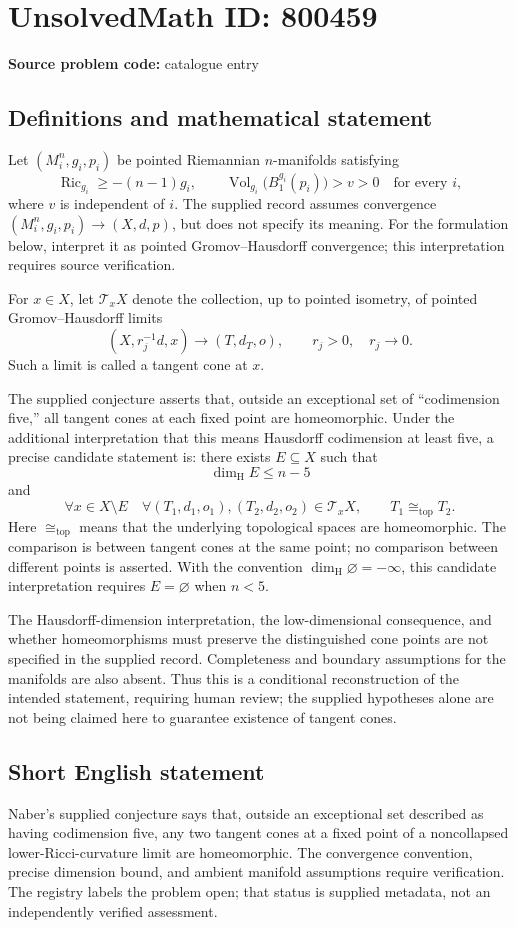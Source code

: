 \documentclass[11pt]{article}
\begin{document}
\section*{UnsolvedMath ID: 800459}
\textbf{Source problem code:} catalogue entry
\subsection{Definitions and mathematical statement}
Let \((M_i^n,g_i,p_i)\) be pointed Riemannian \(n\)-manifolds satisfying
\[
\operatorname{Ric}_{g_i}\geq -(n-1)g_i,
\qquad
\operatorname{Vol}_{g_i}\bigl(B_1^{g_i}(p_i)\bigr)>v>0
\quad\text{for every }i,
\]
where \(v\) is independent of \(i\). The supplied record assumes convergence \((M_i^n,g_i,p_i)\to(X,d,p)\), but does not specify its meaning. For the formulation below, interpret it as pointed Gromov--Hausdorff convergence; this interpretation requires source verification.

For \(x\in X\), let \(\mathcal T_xX\) denote the collection, up to pointed isometry, of pointed Gromov--Hausdorff limits
\[
(X,r_j^{-1}d,x)\longrightarrow(T,d_T,o),
\qquad r_j>0,\quad r_j\to0.
\]
Such a limit is called a tangent cone at \(x\).

The supplied conjecture asserts that, outside an exceptional set of ``codimension five,'' all tangent cones at each fixed point are homeomorphic. Under the additional interpretation that this means Hausdorff codimension at least five, a precise candidate statement is: there exists \(E\subseteq X\) such that
\[
\dim_{\mathrm H}E\leq n-5
\]
and
\[
\forall x\in X\setminus E\quad
\forall (T_1,d_1,o_1),(T_2,d_2,o_2)\in\mathcal T_xX,
\qquad T_1\cong_{\mathrm{top}}T_2.
\]
Here \(\cong_{\mathrm{top}}\) means that the underlying topological spaces are homeomorphic. The comparison is between tangent cones at the same point; no comparison between different points is asserted. With the convention \(\dim_{\mathrm H}\varnothing=-\infty\), this candidate interpretation requires \(E=\varnothing\) when \(n<5\).

The Hausdorff-dimension interpretation, the low-dimensional consequence, and whether homeomorphisms must preserve the distinguished cone points are not specified in the supplied record. Completeness and boundary assumptions for the manifolds are also absent. Thus this is a conditional reconstruction of the intended statement, requiring human review; the supplied hypotheses alone are not being claimed here to guarantee existence of tangent cones.
\subsection{Short English statement}
Naber's supplied conjecture says that, outside an exceptional set described as having codimension five, any two tangent cones at a fixed point of a noncollapsed lower-Ricci-curvature limit are homeomorphic. The convergence convention, precise dimension bound, and ambient manifold assumptions require verification. The registry labels the problem open; that status is supplied metadata, not an independently verified assessment.
\end{document}
